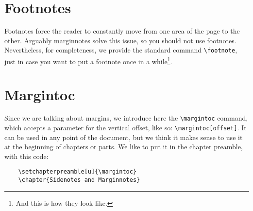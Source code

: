 
\section{Footnotes}

Footnotes force the reader to constantly move from one area of the page 
to the other. Arguably marginnotes solve this issue, so you should not 
use footnotes. Nevertheless, for completeness, we provide the standard 
command \verb|\footnote|, just in case you want to put a footnote once 
in a while\footnote{And this is how they look like.}.

\section{Margintoc}

Since we are talking about margins, we introduce here the 
\verb|\margintoc| command, which accepts a parameter for the vertical 
offset, like so: \verb|\margintoc[offset]|. It can be used in any point 
of the document, but we think it makes sense to use it at the beginning 
of chapters or parts. We like to put it in the chapter preamble, with 
this code:

\begin{verbatim}
	\setchapterpreamble[u]{\margintoc}
	\chapter{Sidenotes and Marginnotes}
\end{verbatim}
